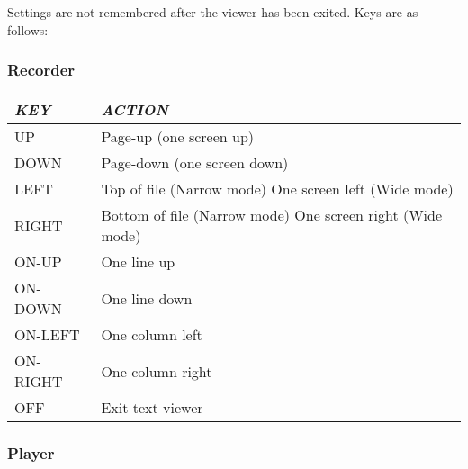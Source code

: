 Settings are not remembered after the viewer has been exited. 
Keys are as follows:

\subsubsection{Recorder}

\begin{tabular}[c]{|p{3.317cm}|p{7.104cm}|}
\hline
{\centering\bfseries\itshape
KEY
\par}
&
{\centering\bfseries\itshape
ACTION
\par}
\\\hline
{\centering
UP
\par}
&
Page{}-up (one screen up)
\\\hline
{\centering
DOWN
\par}
&
Page{}-down (one screen down)
\\\hline
{\centering
LEFT
\par}
&
Top of file (Narrow mode)\newline
One screen left (Wide mode)
\\\hline
{\centering
RIGHT
\par}
&
Bottom of file (Narrow mode)\newline
One screen right (Wide mode)
\\\hline
{\centering
ON{}-UP
\par}
&
One line up
\\\hline
{\centering
ON{}-DOWN
\par}
&
One line down
\\\hline
{\centering
ON{}-LEFT 
\par}
&
One column left
\\\hline
{\centering
ON{}-RIGHT
\par}
&
One column right
\\\hline
{\centering
OFF
\par}
&
Exit text viewer
\\\hline
\end{tabular}

\subsubsection{Player}

